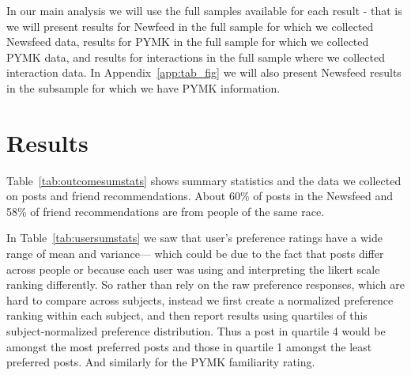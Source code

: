 \documentclass[12pt,letterpaper]{article}
\begin{document}
In our main analysis we will use the full samples available for each result - that is we will present results for Newfeed in the full sample for which we collected Newsfeed data, results for PYMK in the full sample for which we collected PYMK data, and results for interactions in the full sample where we collected interaction data. In Appendix~\ref{app:tab_fig} we will also present Newsfeed results in the subsample for which we have PYMK information.




\section{Results}

Table~\ref{tab:outcomesumstats} shows summary statistics and the data we collected on posts and friend recommendations. About 60\% of posts in the Newsfeed and 58\% of friend recommendations are from people of the same race. 

In Table~\ref{tab:usersumstats} we saw that user's preference ratings have a wide range of mean and variance--- which could be due to the fact that posts differ across people or because each user was using and interpreting the likert scale ranking differently.  So rather than rely on the raw preference responses, which are hard to compare across subjects, instead we first create a normalized preference ranking within each subject, and then report results using quartiles of this subject-normalized preference distribution.  Thus a post in quartile 4 would be amongst the most preferred posts and those in quartile 1 amongst the least preferred posts. And similarly for the PYMK familiarity rating. 
\end{document}
